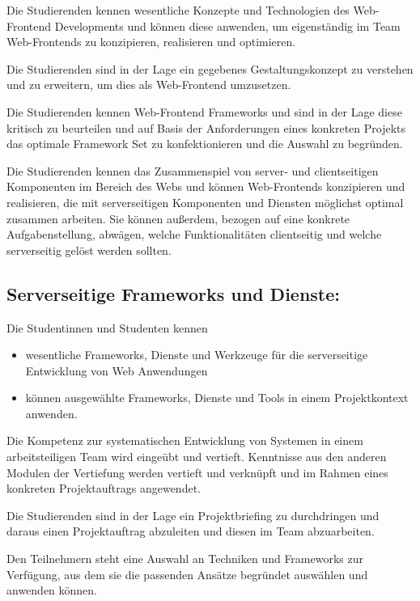Die Studierenden kennen wesentliche Konzepte und Technologien des
Web-Frontend Developments und können diese anwenden, um eigenständig im
Team Web-Frontends zu konzipieren, realisieren und optimieren.

Die Studierenden sind in der Lage ein gegebenes Gestaltungskonzept zu
verstehen und zu erweitern, um dies als Web-Frontend umzusetzen.

Die Studierenden kennen Web-Frontend Frameworks und sind in der Lage
diese kritisch zu beurteilen und auf Basis der Anforderungen eines
konkreten Projekts das optimale Framework Set zu konfektionieren und die
Auswahl zu begründen.

Die Studierenden kennen das Zusammenspiel von server- und clientseitigen
Komponenten im Bereich des Webs und können Web-Frontends konzipieren und
realisieren, die mit serverseitigen Komponenten und Diensten möglichst
optimal zusammen arbeiten. Sie können außerdem, bezogen auf eine
konkrete Aufgabenstellung, abwägen, welche Funktionalitäten clientseitig
und welche serverseitig gelöst werden sollten.

\subsection*{Serverseitige Frameworks und
Dienste:}\label{serverseitige-frameworks-und-dienste}

Die Studentinnen und Studenten kennen

\begin{itemize}
\item
  wesentliche Frameworks, Dienste und Werkzeuge für die serverseitige
  Entwicklung von Web Anwendungen
\item
  können ausgewählte Frameworks, Dienste und Tools in einem
  Projektkontext anwenden.
\end{itemize}

Die Kompetenz zur systematischen Entwicklung von Systemen in einem
arbeitsteiligen Team wird eingeübt und vertieft. Kenntnisse aus den
anderen Modulen der Vertiefung werden vertieft und verknüpft und im
Rahmen eines konkreten Projektauftrags angewendet.

Die Studierenden sind in der Lage ein Projektbriefing zu durchdringen
und daraus einen Projektauftrag abzuleiten und diesen im Team
abzuarbeiten.

Den Teilnehmern steht eine Auswahl an Techniken und Frameworks zur
Verfügung, aus dem sie die passenden Ansätze begründet auswählen und
anwenden können.

